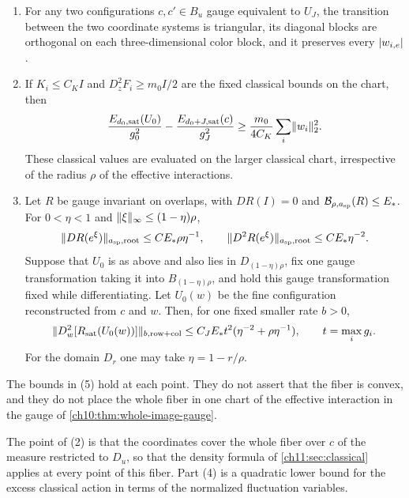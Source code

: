 \begin{theorem}
\begin{enumerate}
\item For any two configurations $c,c'\in B_u$ gauge equivalent to $U_J$, the transition between the two coordinate systems is triangular, its diagonal blocks are orthogonal on each three-dimensional color block, and it preserves every $\lvert w_{i,e}\rvert$.
\item If $K_i\le C_KI$ and $D_z^2F_i\ge m_0I/2$ are the fixed classical bounds on the chart, then
\[
 \frac{E_{d_0,\mathrm{sat}}(U_0)}{g_0^2}-\frac{E_{d_0+J,\mathrm{sat}}(c)}{g_J^2}
 \ge\frac{m_0}{4C_K}\sum_i\lVert w_i\rVert_2^2.
\]
These classical values are evaluated on the larger classical chart, irrespective of the radius $\rho$ of the effective interactions.
\item Let $R$ be gauge invariant on overlaps, with $DR(I)=0$ and $\mathcal B_{\rho,a_{\mathrm{sp}}}(R)\le E_*$. For $0<\eta<1$ and $\lVert \xi\rVert_\infty\le(1-\eta)\rho$,
\[
 \lVert DR(e^\xi)\rVert_{a_{\mathrm{sp}},\mathrm{root}}\le CE_*\rho\eta^{-1},\qquad
 \lVert D^2R(e^\xi)\rVert_{a_{\mathrm{sp}},\mathrm{root}}\le CE_*\eta^{-2}.
\]
Suppose that $U_0$ is as above and also lies in $D_{(1-\eta)\rho}$, fix one gauge transformation taking it into $B_{(1-\eta)\rho}$, and hold this gauge transformation fixed while differentiating. Let $U_0(w)$ be the fine configuration reconstructed from $c$ and $w$. Then, for one fixed smaller rate $b>0$,
\[
 \lVert D_w^2[R_{\mathrm{sat}}(U_0(w))]\rVert_{b,\mathrm{row+col}}\le C_JE_*t^2(\eta^{-2}+\rho\eta^{-1}),\qquad t=\max_ig_i.
\]
For the domain $D_r$ one may take $\eta=1-r/\rho$.
\end{enumerate}
The bounds in (5) hold at each point. They do not assert that the fiber is convex, and they do not place the whole fiber in one chart of the effective interaction in the gauge of \cref{ch10:thm:whole-image-gauge}.
\end{theorem}

The point of (2) is that the coordinates cover the whole fiber over $c$ of the measure restricted to $D_u$, so that the density formula of \cref{ch11:sec:classical} applies at every point of this fiber. Part (4) is a quadratic lower bound for the excess classical action in terms of the normalized fluctuation variables.

